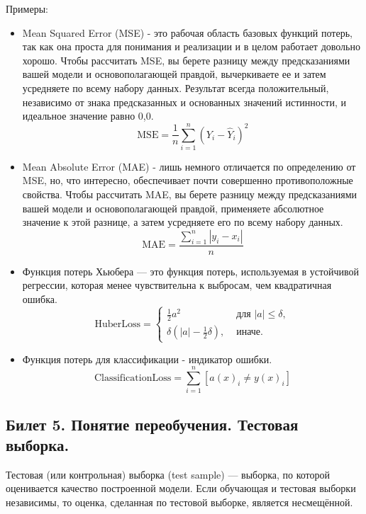 \documentclass[a4paper, 12pt]{article}
\begin{document}
	Примеры:
	\begin{itemize}
		\item Mean Squared Error (MSE) - это рабочая область базовых функций потерь, так как она проста для понимания и реализации и в целом работает довольно хорошо. Чтобы рассчитать MSE, вы берете разницу между предсказаниями вашей модели и основополагающей правдой, вычеркиваете ее и затем усредняете по всему набору данных.
		Результат всегда положительный, независимо от знака предсказанных и основанных значений истинности, и идеальное значение равно 0,0.
		\begin{equation*}
			\mathrm{MSE}=\frac{1}{n} \sum_{i=1}^{n}\left(Y_{i}-\hat{Y}_{i}\right)^{2}
		\end{equation*}
		\item Mean Absolute Error (MAE) - лишь немного отличается по определению от MSE, но, что интересно, обеспечивает почти совершенно противоположные свойства. Чтобы рассчитать MAE, вы берете разницу между предсказаниями вашей модели и основополагающей правдой, применяете абсолютное значение к этой разнице, а затем усредняете его по всему набору данных.
		\begin{equation*}
			\mathrm{MAE}=\frac{\sum_{i=1}^{n}\left|y_{i}-x_{i}\right|}{n}
		\end{equation*}
		\item Функция потерь Хьюбера — это функция потерь, используемая в устойчивой регрессии, которая менее чувствительна к выбросам, чем квадратичная ошибка.
		\begin{equation}
			\mathrm{HuberLoss}=\left\{\begin{array}{ll}
				\frac{1}{2} a^{2} & \text { для }|a| \leq \delta, \\
				\delta\left(|a|-\frac{1}{2} \delta\right), & \text { иначе. }
			\end{array}\right.
		\end{equation}
		\item Функция потерь для классификации - индикатор ошибки.
		\begin{equation*}
			\mathrm{ClassificationLoss}=\sum_{i=1}^{n} [a(x)_{i} \neq y(x)_{i}]
		\end{equation*}
	\end{itemize}
	\subsection*{Билет 5. Понятие переобучения. Тестовая выборка.}
	Тестовая (или контрольная) выборка (test sample) — выборка, по которой оценивается качество построенной модели. Если обучающая и тестовая выборки независимы, то оценка, сделанная по тестовой выборке, является несмещённой.
	
\end{document}
